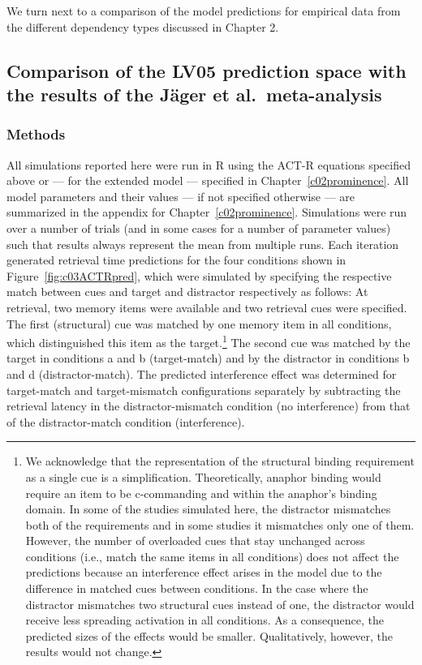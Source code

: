 \documentclass{cambridge7A}\usepackage[]{graphicx}\usepackage[]{color}
\newcommand{\R}{\textsf{R}}
\begin{document}
We turn next to a comparison of the model predictions for  empirical data from the different dependency types discussed in Chapter 2. 

\subsection{Comparison of the LV05 prediction space with the results of the J\"ager et al.\ meta-analysis}

\subsubsection{Methods}
\label{sec:generalmethods}
All simulations reported here were run in \R{} \citep{R2016} using the ACT-R equations specified above or --- for the extended model --- specified in Chapter~\ref{c02prominence}. All model parameters and their values --- if not specified otherwise --- are summarized in the appendix for Chapter~\ref{c02prominence}. Simulations were run over a number of trials (and in some cases for a number of parameter values) such that results always represent the mean from multiple runs. Each iteration generated retrieval time predictions for the four conditions shown in Figure~\ref{fig:c03ACTRpred}, which were simulated by specifying the respective match between cues and target and distractor respectively as follows: 
At retrieval, two memory items were available and two retrieval cues were specified. The first (structural) cue was matched by one memory item in all conditions, which distinguished this item as the target.\footnote{We acknowledge that the representation of the structural binding requirement as a single cue is a simplification. Theoretically, anaphor binding would require an item to be c-commanding and within the anaphor's binding domain. In some of the studies simulated here, the distractor mismatches both of the requirements and in some studies it mismatches only one of them. 
	However, the number of overloaded cues that stay unchanged across conditions (i.e., match the same items in all conditions) does not affect the predictions because an interference effect arises in the model due to the difference in matched cues between conditions. In the case where the distractor mismatches two structural cues instead of one, the distractor would receive less spreading activation in all conditions. As a consequence, the predicted sizes of the effects would be smaller. Qualitatively, however, the results would not change.}
The second cue was matched by the target in conditions a and b (target-match) and by the distractor in conditions b and d (distractor-match).
The predicted interference effect was determined for  target-match and  target-mismatch configurations separately by subtracting the retrieval latency in the distractor-mismatch condition (no interference) from that of the distractor-match condition (interference).  
\end{document}
